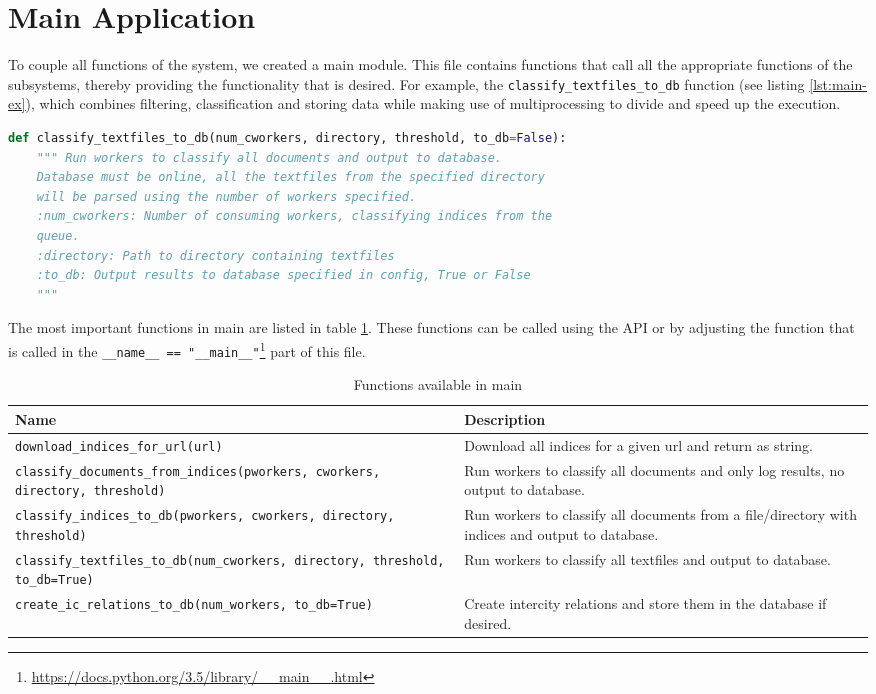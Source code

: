 \section{Main Application} \label{sec:main-app}
To couple all functions of the system, we created a main module. This file contains functions that call all the appropriate functions of the subsystems, thereby providing the functionality that is desired. For example, the \texttt{classify\_textfiles\_to\_db} function (see listing \ref{lst:main-ex}), which combines filtering, classification and storing data while making use of multiprocessing to divide and speed up the execution.

\begin{lstlisting}[language=Python, caption=Header of a function in main.py, label={lst:main-ex}]
def classify_textfiles_to_db(num_cworkers, directory, threshold, to_db=False):
    """ Run workers to classify all documents and output to database.
    Database must be online, all the textfiles from the specified directory
    will be parsed using the number of workers specified.
    :num_cworkers: Number of consuming workers, classifying indices from the
    queue.
    :directory: Path to directory containing textfiles
    :to_db: Output results to database specified in config, True or False
    """
\end{lstlisting}

The most important functions in main are listed in table \ref{tbl:main-functions}. These functions can be called using the API or by adjusting the function that is called in the \texttt{\_\_name\_\_ == "\_\_main\_\_"}\footnote{\url{https://docs.python.org/3.5/library/__main__.html}} part of this file.

\begin{table}[H]
\centering
\begin{tabular}{m{8cm} m{8cm}}
\textbf{Name}                     & \textbf{Description} \\\hline
\texttt{download\_indices\_for\_url(url)} & Download all indices for a given url and return as string. \\\hline

\texttt{classify\_documents\_from\_indices(pworkers, cworkers, directory, threshold)} & Run workers to classify all documents and only log results, no output to database.\\\hline

\texttt{classify\_indices\_to\_db(pworkers, cworkers, directory, threshold)} & Run workers to classify all documents from a file/directory with indices and output to database.\\\hline

\texttt{classify\_textfiles\_to\_db(num\_cworkers, directory, threshold, to\_db=True)} & Run workers to classify all textfiles and output to database.\\\hline

\texttt{create\_ic\_relations\_to\_db(num\_workers, to\_db=True)} & Create intercity relations and store them in the database if desired. \\\hline 

\end{tabular}
\caption{Functions available in main}
\label{tbl:main-functions}
\end{table}
